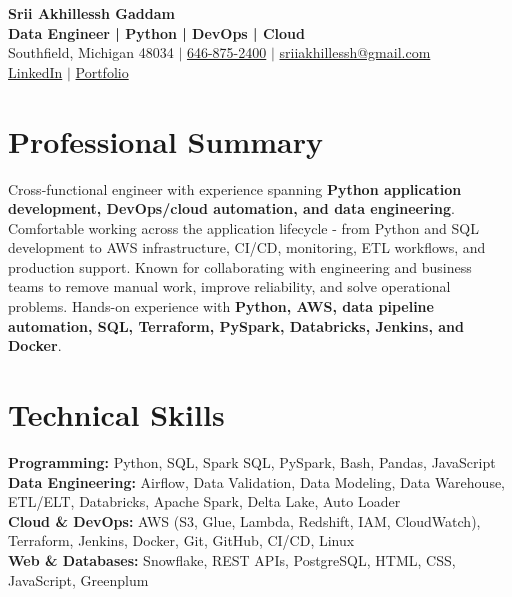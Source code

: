 \documentclass[letterpaper,10pt]{article}
\begin{document}
\fontsize{9.35pt}{10.45pt}\selectfont

\begin{center}
    {\LARGE \textbf{Srii Akhillessh Gaddam}} \\[-1pt]
    \textbf{Data Engineer | Python | DevOps | Cloud} \\[2pt]
    Southfield, Michigan 48034 $|$
    \href{tel:6468752400}{646-875-2400} $|$
    \href{mailto:sriiakhillessh@gmail.com}{sriiakhillessh@gmail.com} \\[1pt]
    \href{https://www.linkedin.com/in/srii-akhiilessh-gaddam-b48668191/}{LinkedIn} $|$
    \href{https://sriiakhillesshg.github.io/portfolio/}{Portfolio}
\end{center}
\vspace{-8pt}

\section{Professional Summary}
\small{Cross-functional engineer with experience spanning \textbf{Python application development, DevOps/cloud automation, and data engineering}. Comfortable working across the application lifecycle - from Python and SQL development to AWS infrastructure, CI/CD, monitoring, ETL workflows, and production support. Known for collaborating with engineering and business teams to remove manual work, improve reliability, and solve operational problems. Hands-on experience with \textbf{Python, AWS, data pipeline automation, SQL, Terraform, PySpark, Databricks, Jenkins, and Docker}.}

\section{Technical Skills}
\small{
\textbf{Programming:} Python, SQL, Spark SQL, PySpark, Bash, Pandas, JavaScript \\
\textbf{Data Engineering:} Airflow, Data Validation, Data Modeling, Data Warehouse, ETL/ELT, Databricks, Apache Spark, Delta Lake, Auto Loader \\
\textbf{Cloud \& DevOps:} AWS (S3, Glue, Lambda, Redshift, IAM, CloudWatch), Terraform, Jenkins, Docker, Git, GitHub, CI/CD, Linux \\
\textbf{Web \& Databases:} Snowflake, REST APIs, PostgreSQL, HTML, CSS, JavaScript, Greenplum
}
\end{document}
